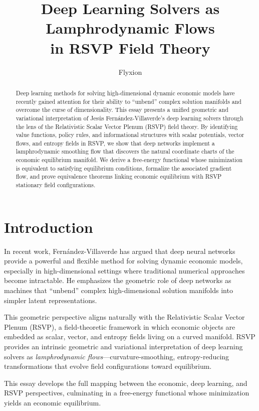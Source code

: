 \documentclass[12pt]{article}
\title{\textbf{Deep Learning Solvers as Lamphrodynamic Flows\\
in RSVP Field Theory}}
\author{Flyxion}
\date{}
\begin{document}
\maketitle

\begin{abstract}
Deep learning methods for solving high-dimensional dynamic economic 
models have recently gained attention for their ability to ``unbend'' 
complex solution manifolds and overcome the curse of dimensionality. 
This essay presents a unified geometric and variational interpretation 
of Jesús Fernández-Villaverde’s deep learning solvers through the lens 
of the Relativistic Scalar Vector Plenum (RSVP) field theory. By 
identifying value functions, policy rules, and informational structures 
with scalar potentials, vector flows, and entropy fields in RSVP, we 
show that deep networks implement a lamphrodynamic smoothing flow that 
discovers the natural coordinate charts of the economic equilibrium 
manifold. We derive a free-energy functional whose minimization is 
equivalent to satisfying equilibrium conditions, formalize the 
associated gradient flow, and prove equivalence theorems linking 
economic equilibrium with RSVP stationary field configurations.
\end{abstract}

\section{Introduction}

In recent work, Fernández-Villaverde has argued that deep neural 
networks provide a powerful and flexible method for solving dynamic 
economic models, especially in high-dimensional settings where 
traditional numerical approaches become intractable. He emphasizes the 
geometric role of deep networks as machines that ``unbend'' complex 
high-dimensional solution manifolds into simpler latent representations.

This geometric perspective aligns naturally with the 
Relativistic Scalar Vector Plenum (RSVP), a field-theoretic framework 
in which economic objects are embedded as scalar, vector, and entropy 
fields living on a curved manifold. RSVP provides an intrinsic geometric 
and variational interpretation of deep learning solvers as 
\emph{lamphrodynamic flows}---curvature-smoothing, entropy-reducing 
transformations that evolve field configurations toward equilibrium.

This essay develops the full mapping between the economic, deep 
learning, and RSVP perspectives, culminating in a free-energy functional 
whose minimization yields an economic equilibrium.
\end{document}
